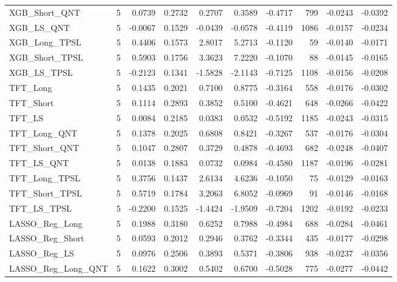 \begin{tabular}{llrrrrrrrr}
\cline{1-10}
XGB\_Short\_QNT & 5 & 0.0739 & 0.2732 & 0.2707 & 0.3589 & -0.4717 & 799 & -0.0243 & -0.0392 \\
\cline{1-10}
XGB\_LS\_QNT & 5 & -0.0067 & 0.1529 & -0.0439 & -0.0578 & -0.4119 & 1086 & -0.0157 & -0.0234 \\
\cline{1-10}
XGB\_Long\_TPSL & 5 & 0.4406 & 0.1573 & 2.8017 & 5.2713 & -0.1120 & 59 & -0.0140 & -0.0171 \\
\cline{1-10}
XGB\_Short\_TPSL & 5 & 0.5903 & 0.1756 & 3.3623 & 7.2220 & -0.1070 & 88 & -0.0145 & -0.0165 \\
\cline{1-10}
XGB\_LS\_TPSL & 5 & -0.2123 & 0.1341 & -1.5828 & -2.1143 & -0.7125 & 1108 & -0.0156 & -0.0208 \\
\cline{1-10}
TFT\_Long & 5 & 0.1435 & 0.2021 & 0.7100 & 0.8775 & -0.3164 & 558 & -0.0176 & -0.0302 \\
\cline{1-10}
TFT\_Short & 5 & 0.1114 & 0.2893 & 0.3852 & 0.5100 & -0.4621 & 648 & -0.0266 & -0.0422 \\
\cline{1-10}
TFT\_LS & 5 & 0.0084 & 0.2185 & 0.0383 & 0.0532 & -0.5192 & 1185 & -0.0243 & -0.0315 \\
\cline{1-10}
TFT\_Long\_QNT & 5 & 0.1378 & 0.2025 & 0.6808 & 0.8421 & -0.3267 & 537 & -0.0176 & -0.0304 \\
\cline{1-10}
TFT\_Short\_QNT & 5 & 0.1047 & 0.2807 & 0.3729 & 0.4878 & -0.4693 & 682 & -0.0248 & -0.0407 \\
\cline{1-10}
TFT\_LS\_QNT & 5 & 0.0138 & 0.1883 & 0.0732 & 0.0984 & -0.4580 & 1187 & -0.0196 & -0.0281 \\
\cline{1-10}
TFT\_Long\_TPSL & 5 & 0.3756 & 0.1437 & 2.6134 & 4.6236 & -0.1050 & 75 & -0.0129 & -0.0163 \\
\cline{1-10}
TFT\_Short\_TPSL & 5 & 0.5719 & 0.1784 & 3.2063 & 6.8052 & -0.0969 & 91 & -0.0146 & -0.0168 \\
\cline{1-10}
TFT\_LS\_TPSL & 5 & -0.2200 & 0.1525 & -1.4424 & -1.9509 & -0.7204 & 1202 & -0.0192 & -0.0233 \\
\cline{1-10}
LASSO\_Reg\_Long & 5 & 0.1988 & 0.3180 & 0.6252 & 0.7988 & -0.4984 & 688 & -0.0284 & -0.0461 \\
\cline{1-10}
LASSO\_Reg\_Short & 5 & 0.0593 & 0.2012 & 0.2946 & 0.3762 & -0.3344 & 435 & -0.0177 & -0.0298 \\
\cline{1-10}
LASSO\_Reg\_LS & 5 & 0.0976 & 0.2506 & 0.3893 & 0.5371 & -0.3806 & 938 & -0.0237 & -0.0356 \\
\cline{1-10}
LASSO\_Reg\_Long\_QNT & 5 & 0.1622 & 0.3002 & 0.5402 & 0.6700 & -0.5028 & 775 & -0.0277 & -0.0442 \\

\end{tabular}
